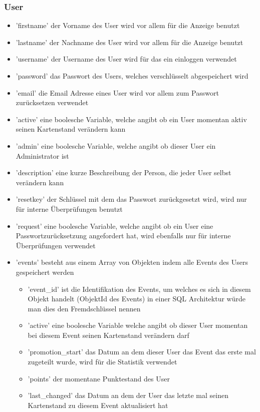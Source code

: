 \subsubsection{User}
\begin{itemize}
	\item 'firstname' der Vorname des User wird vor allem für die Anzeige benutzt
	\item 'lastname' der Nachname des User wird vor allem für die Anzeige benutzt
	\item 'username' der Username des User wird für das ein einloggen verwendet
	\item 'password' das Passwort des Users, welches verschlüsselt abgespeichert wird
	\item 'email' die Email Adresse eines User wird vor allem zum Passwort zurücksetzen verwendet
	\item 'active' eine boolesche Variable, welche angibt ob ein User momentan aktiv seinen Kartenstand verändern kann
	\item 'admin' eine boolesche Variable, welche angibt ob dieser User ein Administrator ist
	\item 'description' eine kurze Beschreibung der Person, die jeder User selbst verändern kann
	\item 'resetkey' der Schlüssel mit dem das Passwort zurückgesetzt wird, wird nur für interne Überprüfungen benutzt
	\item 'request' eine boolesche Variable, welche angibt ob ein User eine Passwortzurücksetzung angefordert hat, wird ebenfalls nur für interne Überprüfungen verwendet
	\item 'events' besteht aus einem Array von Objekten indem alle Events des Users gespeichert werden
	\begin{itemize}
		\item 'event\_id' ist die Identifikation des Events, um welches es sich in diesem Objekt handelt (ObjektId des Events) in einer SQL Architektur würde man dies den Fremdschlüssel nennen
		\item 'active' eine boolesche Variable welche angibt ob dieser User momentan bei diesem Event seinen Kartenstand verändern darf
		\item 'promotion\_start' das Datum an dem dieser User das Event das erste mal zugeteilt wurde, wird für die Statistik verwendet
		\item 'points' der momentane Punktestand des User
		\item 'last\_changed' das Datum an dem der User das letzte mal seinen Kartenstand zu diesem Event aktualisiert hat

\end{itemize}
\end{itemize}
